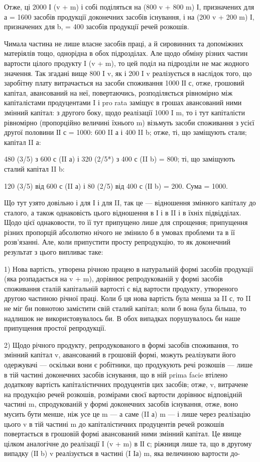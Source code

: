 Отже, ці 2000 І (v + m) і собі поділяться на (800 v + 800 m) І,
призначених для а = 1600 засобів продукції доконечних засобів існування,
і на (200 v + 200 m) І, призначених для b, = 400 засобів продукції
речей розкошів.

Чимала частина не лише власне засобів праці, а й сировинних та
допоміжних матеріялів тощо, однорідна в обох підрозділах. Але щодо
обміну різних частин вартости цілого продукту I (v + m), то цей поділ
на підрозділи не має жодного значення. Так згадані вище 800 I v, як і
200 I v реалізується в наслідок того, що заробітну плату витрачається
на засоби споживання 1000 ІІ с, отже, грошовий капітал, авансований на
неї, повертаючись, розподіляється рівномірно між капіталістами продуцентами
I і pro rata заміщує в грошах авансований ними змінний капітал:
з другого боку, щодо реалізації 1000 I m, то і тут капіталісти рівномірно
(пропорційно величині їхнього m) візьмуть засоби споживання з
усієї другої половини ІІ с = 1000: 600 II а і 400 II b; отже, ті, що заміщують
стали; капітал II а:

480 (3/5) з 600 с (II а) і 320 (2/5*) з 400 с (II b) = 800; ті, що заміщують
сталий капітал II b:

120 (3/5) від 600 с (II а) і 80 (2/5) від 400 с (ІІ b) = 200. Сума = 1000.

Що тут узято довільно і для І і для II, так це — відношення змінного
капіталу до сталого, а також однаковість цього відношення в
І і в II і в їхніх підвідділах. Щодо цієї однаковости, то її тут припущено
лише для спрощення; припущення різних пропорцій абсолютно нічого
не змінило б в умовах проблеми та в її розв’язанні. Але, коли припустити
просту репродукцію, то як доконечний результат з цього випливає таке:

1) Нова вартість, утворена річною працею в натуральній формі засобів
продукції (яка розпадається на v + m), дорівнює репродукованій
у формі засобів споживання сталій капітальній вартості с від вартости
продукту, утвореного другою частиною річної праці. Коли б ця нова вартість
була менша за II с, то II не міг би повнотою замістити свій сталий капітал;
коли б вона була більша, то надлишок не використовувалось би. В
обох випадках порушувалось би наше припущення простої репродукції.

2) Щодо річного продукту, репродукованого в формі засобів споживання,
то змінний капітал v, авансований в грошовій формі, можуть реалізувати
його одержувачі — оскільки вони є робітники, що продукують
речі розкошів — лише в тій частині доконечних засобів існування, що в
ній prima facie втілено додаткову вартість капіталістичних продуцентів
цих засобів; отже, v, витрачене на продукцію речей розкошів, розмірами
своєї вартости дорівнює відповідній частині m, спродукованій у
формі доконечних засобів існування, отже, воно мусить бути менше, ніж
усе це m — а саме (II а) m — і лише через реалізацію цього v в тій частині
m до капіталістичних продуцентів речей розкошів повертається в грошовій
формі авансований ними змінний капітал. Це явище цілком аналогічне
до реалізації I (v + m) в ІІ с; ріжниця лише та, що в другому випадку
(IІ b) v реалізується в частині (I Iа) m, яка величиною вартости до-

